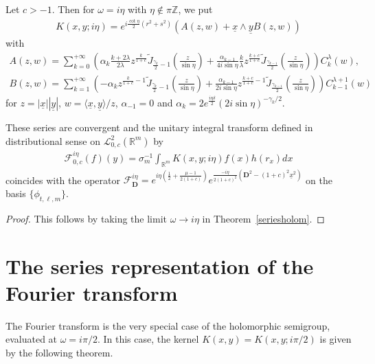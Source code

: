 \documentclass[pdftex]{sigma}
\numberwithin{equation}{section}
\numberwithin{theorem}{section}
\numberwithin{proposition}{section}
\numberwithin{lemma}{section}
\numberwithin{corollary}{section}
\numberwithin{definition}{section}
\numberwithin{example}{section}
\numberwithin{remark}{section}
\numberwithin{note}{section}
\theoremstyle{remark}
\newcommand{\mR}{\mathbb{R}}
\newcommand{\mZ}{\mathbb{Z}}
\newcommand{\cF}{\mathcal{F}}
\newcommand{\cL}{\mathcal{L}}
\newcommand{\dD}{\textbf{D}}
\newcommand{\ux}{\underline{x}}
\newcommand{\uy}{\underline{y}}
\def\l{{\lambda}}
\def\d{{\delta}}
\def\o{{\omega}}
\def\la{{\langle}}
\def\ra{{\rangle}}
\begin{document}
\begin{theorem}%
Let $c>-1$.
Then for $\o=i\eta$ with $\eta\not\in\pi\mZ$, we put
\begin{gather*}K(x,y;i\eta)=e^{i\frac{\cot{\eta}}{2}(r^{2}+s^{2})}\left(A(z,w)+\ux\wedge\uy
B(z,w)\right)
\end{gather*}
with{\samepage
\begin{gather*}
A(z,w) = \sum_{k=0}^{+\infty} \left(\alpha_{k} \frac{k+2\l}{2\l} z^{\frac{k}{1+c}}
\widetilde{J}_{\frac{\gamma_{k}}{2}-1}\left(\frac{z}{\sin{\eta}}\right) +\frac{
\alpha_{k-1}}{4i\sin{\eta}} \frac{k}{\l} z^{\frac{k+c}{1+c}}
\widetilde{J}_{\frac{\gamma_{k-1}}{2}}\left(\frac{z}{\sin{\eta}}\right)\right) C_{k}^{\l}(w),\\
B(z,w) = \sum_{k=1}^{+\infty} \left(-\alpha_{k} z^{\frac{k}{1+c}-1}
\widetilde{J}_{\frac{\gamma_{k}}{2}-1}\left(\frac{z}{\sin{\eta}}\right) +
\frac{\alpha_{k-1}}{2i\sin{\eta}} z^{\frac{k+c}{1+c}-1}
\widetilde{J}_{\frac{\gamma_{k-1}}{2}}\left(\frac{z}{\sin{\eta}}\right)\right) C_{k-1}^{\l+1}(w)
\end{gather*}
for $z=|\ux||\uy|$, $w=\la\ux,\uy\ra/z$, $\alpha_{-1}=0$ and
$
\alpha_{k}=2e^{\frac{i\eta\d}{2}}(2i\sin{\eta})^{-\gamma_{k}/2}$.}


These series are convergent and the unitary integral transform defined in distributional sense on
$\cL^{2}_{0,c}(\mR^{m})$ by
\begin{gather*}
\cF_{0,c}^{i\eta}(f)(y)=\sigma_{m}^{-1}\int_{\mR^{m}}K(x,y;i\eta)f(x)h(r_{x})dx
\end{gather*}
coincides with the operator $\cF_{\dD}^{i\eta}=e^{i\eta\left(\frac{1}{2}+\frac{\mu-1}{2(1+c)}
\right)}e^{\frac{-i\eta}{2(1+c)^{2}}\left(\dD^{2}-(1+c)^{2}\ux^{2}\right)}$ on the basis $\{
\phi_{t,\ell,m}\}$.
\end{theorem}

\begin{proof}
This follows by taking the limit $\o\rightarrow i\eta$ in Theorem~\ref{seriesholom}.
\end{proof}

\section{The series representation of the Fourier transform}\label{section7}

The Fourier transform is the very special case of the holomorphic semigroup, evaluated at $\o=i
\pi/2$.
In this case, the kernel $K(x,y)=K(x,y;i\pi/2)$ is given by the following theorem.
\end{document}
